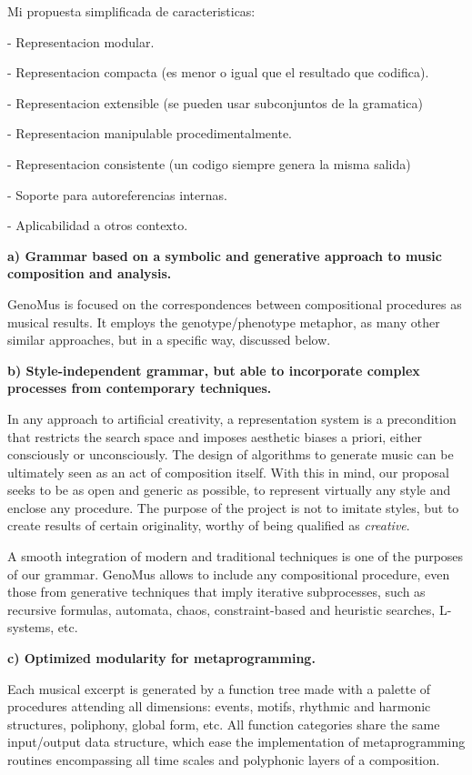 \documentclass{article}
\begin{document}
{\color{red}Mi propuesta simplificada de caracteristicas:

- Representacion modular.

- Representacion compacta (es menor o igual que el resultado que codifica).

- Representacion extensible (se pueden usar subconjuntos de la gramatica)

- Representacion manipulable procedimentalmente.

- Representacion consistente (un codigo siempre genera la misma salida)

- Soporte para autoreferencias internas.

- Aplicabilidad a otros contexto.
}

\textbf{a) Grammar based on a symbolic and generative approach to music composition and analysis.}

GenoMus is focused on the correspondences between compositional procedures as musical results. It employs the genotype/phenotype metaphor, as many other similar approaches, but in a specific way, discussed below.

\textbf{b) Style-independent grammar, but able to incorporate complex processes from contemporary techniques.} 

In any approach to artificial creativity, a representation system is a precondition that restricts the search space and imposes aesthetic biases a priori, either consciously or unconsciously. The design of algorithms to generate music can be ultimately seen as an act of composition itself. With this in mind, our proposal seeks to be as open and generic as possible, to represent virtually any style and enclose any procedure. The purpose of the project is not to imitate styles, but to create results of certain originality, worthy of being qualified as \emph{creative}. 

A smooth integration of modern and traditional techniques is one of the purposes of our grammar. GenoMus allows to include any compositional procedure, even those from generative techniques that imply iterative subprocesses, such as recursive formulas, automata, chaos, constraint-based and heuristic searches, L-systems, etc. 

\textbf{c) Optimized modularity for metaprogramming.}

Each musical excerpt is generated by a function tree made with a palette of procedures attending all dimensions: events, motifs, rhythmic and harmonic structures, poliphony, global form, etc. All function categories share the same input/output data structure, which ease the implementation of metaprogramming routines encompassing all time scales and polyphonic layers of a composition.
\end{document}
